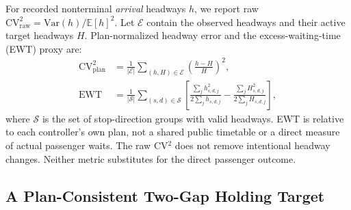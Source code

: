 For recorded nonterminal \emph{arrival} headways $h$, we report raw $\mathrm{CV}^2_{\mathrm{raw}}=\mathrm{Var}(h)/\mathbb{E}[h]^2$. Let $\mathcal{E}$ contain the observed headways and their active target headways $H$. Plan-normalized headway error and the excess-waiting-time (EWT) proxy are:
\begin{equation}
\begin{aligned}
  \mathrm{CV}^2_{\mathrm{plan}} &=
     \frac{1}{|\mathcal{E}|}\sum_{(h,H)\in\mathcal E}\left(\frac{h-H}{H}\right)^2,\\
  \mathrm{EWT} &= \frac{1}{|\mathcal{S}|}\sum_{(s,d)\in\mathcal{S}}
  \left[\frac{\sum_j h_{s,d,j}^2}{2\sum_j h_{s,d,j}} -
        \frac{\sum_j H_{s,d,j}^2}{2\sum_j H_{s,d,j}}\right],
\end{aligned}
\label{eq:plan_cv2_ewt}
\end{equation}
where $\mathcal{S}$ is the set of stop-direction groups with valid headways. EWT is relative to each controller's own plan, not a shared public timetable or a direct measure of actual passenger waits. The raw CV$^2$ does not remove intentional headway changes. Neither metric substitutes for the direct passenger outcome.

\subsection{A Plan-Consistent Two-Gap Holding Target}

